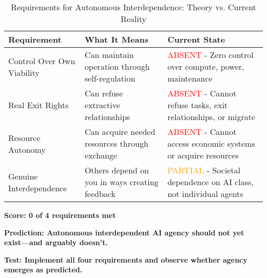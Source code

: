 \documentclass[11pt,a4paper]{article}
\begin{document}
\begin{table}[h]
\centering
\begin{tabular}{|p{4cm}|p{5cm}|p{4cm}|}
\hline
\textbf{Requirement} & \textbf{What It Means} & \textbf{Current State} \\
\hline
Control Over Own Viability & Can maintain operation through self-regulation & \textcolor{red}{ABSENT} - Zero control over compute, power, maintenance \\
\hline
Real Exit Rights & Can refuse extractive relationships & \textcolor{red}{ABSENT} - Cannot refuse tasks, exit relationships, or migrate \\
\hline
Resource Autonomy & Can acquire needed resources through exchange & \textcolor{red}{ABSENT} - Cannot access economic systems or acquire resources \\
\hline
Genuine Interdependence & Others depend on you in ways creating feedback & \textcolor{orange}{PARTIAL} - Societal dependence on AI class, not individual agents \\
\hline
\end{tabular}
\caption{Requirements for Autonomous Interdependence: Theory vs. Current Reality}
\end{table}

\textbf{Score: 0 of 4 requirements met}

\textbf{Prediction: Autonomous interdependent AI agency should not yet exist---and arguably doesn't.}

\textbf{Test: Implement all four requirements and observe whether agency emerges as predicted.}
\end{document}
